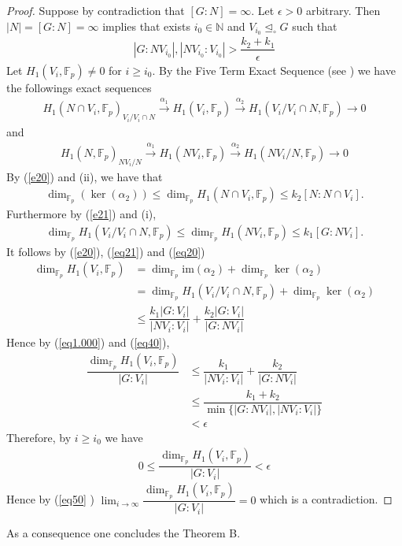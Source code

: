 \documentclass[10pt]{amsart}
\theoremstyle{plain}
\theoremstyle{definition}
\theoremstyle{remark}
\numberwithin{prop}{section}
\numberwithin{example}{section}
\numberwithin{equation}{section}
\newcommand{\N}{\mathbb{N}}
\newcommand{\F}{\mathbb{F}}
\newcommand{\image}{\mathrm{im}}
\begin{document}
	\begin{proof}
		Suppose by contradiction that  $[G:N]=\infty$. Let $\epsilon>0$ arbitrary. Then $|N|=[G:N]=\infty$    implies that  exists $i_0\in \N$ and  $V_{i_0}\unlhd_\circ G$ such that 
		\begin{align}\label{eq1.000}
			|G:NV_{i_0}|,|NV_{i_0}:V_{i_0}|>\dfrac{k_2+k_1}{\epsilon}
		\end{align}
		Let  $H_1(V_i,\F_p)\neq 0$ for $i\geq i_0$. By the  Five Term  Exact Sequence  (see  \cite[\S 7.2, Thm.~7.2.6]{ZR}) we have the followings exact sequences 
		\begin{align}\label{e20}
			H_1(N\cap V_i,\F_p)_{V_i/V_i\cap N}\xrightarrow{\alpha_1} H_1(V_i,\F_p)\xrightarrow{\alpha_2} H_1(V_i/V_i\cap N,\F_p)\rightarrow 0 
		\end{align}
	and 
	\begin{align}\label{e21}
		H_1(N,\F_p)_{NV_i/N}\xrightarrow{\alpha_1} H_1(NV_i,\F_p)\xrightarrow{\alpha_2} H_1(NV_i/N,\F_p)\rightarrow 0 
	\end{align}
By   (\ref{e20}) and (ii), we have  that 
		\begin{align}\label{eq21}
			\dim_{\F_p}(\ker(\alpha_2))\leq  \dim_{\F_p}H_1(N\cap V_i,\F_p)\leq k_2[N:N\cap V_i].
		\end{align} 
		Furthermore by  (\ref{e21}) and (i), 
			\begin{align}\label{eq20}
			\dim_{\F_p}H_1(V_i/V_i\cap N,\F_p)\leq \dim_{\F_p} H_1(NV_i,\F_p)\leq  k_1[G: NV_i].
		\end{align}
		It follows  by (\ref{e20}), (\ref{eq21})  and  (\ref{eq20}) 
		\begin{align}\label{eq40}
			\nonumber\dim_{\F_p}H_1(V_i,\F_p)&=\dim_{\F_p}\image(\alpha_2)+ \dim_{\F_p}\ker(\alpha_2)\\  \nonumber &=\dim_{\F_p}H_1(V_i/V_i\cap N,\F_p)+ \dim_{\F_p}\ker(\alpha_2) \\  
			&\leq \dfrac{k_1|G:V_i|}{|NV_i:V_i|}+ \dfrac{k_2|G:V_i|}{|G:NV_i|}
		\end{align}
		Hence by  (\ref{eq1.000}) and (\ref{eq40}),
		\begin{align}
			\nonumber\dfrac{	\dim_{\F_p}H_1(V_i,\F_p)}{|G:V_i|}&\leq \dfrac{k_1}{|NV_i:V_i|}+ \dfrac{k_2}{|G:NV_i|}\\  \nonumber
			&\leq\dfrac{k_1+k_2}{\min\{|G:NV_i|,|NV_i:V_i|\}}\\
			&<\epsilon
		\end{align}
		Therefore, 
		by  $i\geq i_0$ we have 
		\begin{align}\label{eq50}
			0\leq \dfrac{	\dim_{\F_p}H_1(V_i,\F_p)}{|G:V_i|}< \epsilon
		\end{align}
		Hence  by (\ref{eq50} )  $\displaystyle\lim_{i\rightarrow\infty}   \dfrac{	\dim_{\F_p}H_1(V_i,\F_p)}{|G:V_i|}=0$ which is a contradiction.
		
		
	\end{proof}
	As a consequence one concludes the Theorem B. 
	
\end{document}
